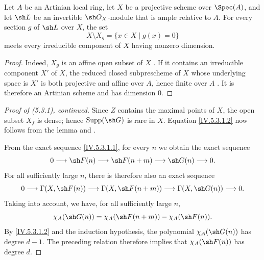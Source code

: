 \begin{lemma}[5.3.1.3]
\label{IV.5.3.1.3}
Let $A$ be an Artinian local ring, let $X$ be a projective scheme over
$\Spec(A)$, and let $\sh L$ be an invertible $\sh O_X$-module that is
ample relative to $A$.
For every section $g$ of $\sh L$ over $X$, the set
\[
X\setminus X_g=\{x\in X\mid g(x)=0\}
\]
meets every irreducible component of $X$ having nonzero dimension.
\end{lemma}

\begin{proof}
Indeed, $X_g$ is an affine open subset of $X$
.
If it contains an irreducible component $X'$ of $X$, the reduced
closed subprescheme of $X$ whose underlying space is $X'$ is both
projective and affine over $A$, hence finite over $A$
.
It is therefore an Artinian scheme and has dimension $0$.
\end{proof}

\begin{proof}[Proof of \emph{(5.3.1)}, continued]
Since $Z$ contains the maximal points of $X$, the open subset $X_f$
is dense; hence $\operatorname{Supp}(\sh G)$ is rare in $X$.
Equation \eqref{IV.5.3.1.2} now follows from the lemma and
.


From the exact sequence \eqref{IV.5.3.1.1}, for every $n$ we obtain
the exact sequence
\[
0\longrightarrow\sh F(n)
 \longrightarrow\sh F(n+m)
 \longrightarrow\sh G(n)
 \longrightarrow0.
\]
For all sufficiently large $n$, there is therefore also an exact
sequence 
\[
0\longrightarrow\Gamma(X,\sh F(n))
 \longrightarrow\Gamma(X,\sh F(n+m))
 \longrightarrow\Gamma(X,\sh G(n))
 \longrightarrow0.
\]
Taking  into account, we have, for all
sufficiently large $n$,
\[
\chi_A(\sh G(n))
  =\chi_A(\sh F(n+m))-\chi_A(\sh F(n)).
\]
By \eqref{IV.5.3.1.2} and the induction hypothesis, the polynomial
$\chi_A(\sh G(n))$ has degree $d-1$.
The preceding relation therefore implies that
$\chi_A(\sh F(n))$ has degree $d$.
\end{proof}
